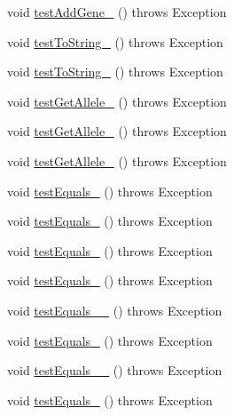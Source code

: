 \begin{DoxyCompactItemize}
\item 
void \hyperlink{classorg_1_1jgap_1_1impl_1_1_composite_gene_test_ac6b01fd11d9996a0d66044e37bbfc5b4}{test\-Add\-Gene\-\_} ()  throws Exception 
\item 
void \hyperlink{classorg_1_1jgap_1_1impl_1_1_composite_gene_test_a62e6b1961eb6dbcc835eaa65c7d4b17f}{test\-To\-String\-\_} ()  throws Exception 
\item 
void \hyperlink{classorg_1_1jgap_1_1impl_1_1_composite_gene_test_aa1d241338660b17f3e24c8630d6ea5b7}{test\-To\-String\-\_} ()  throws Exception 
\item 
void \hyperlink{classorg_1_1jgap_1_1impl_1_1_composite_gene_test_ab8d50eaecdfe73a5c69a156971c5c0e1}{test\-Get\-Allele\-\_} ()  throws Exception 
\item 
void \hyperlink{classorg_1_1jgap_1_1impl_1_1_composite_gene_test_a6bf6bbfa64aada8a4badfbf9bf7b1027}{test\-Get\-Allele\-\_} ()  throws Exception 
\item 
void \hyperlink{classorg_1_1jgap_1_1impl_1_1_composite_gene_test_ad3817f1ccfd22a82fd91740376ede5b3}{test\-Get\-Allele\-\_} ()  throws Exception 
\item 
void \hyperlink{classorg_1_1jgap_1_1impl_1_1_composite_gene_test_a83b896193c39877d30c8b31c8ef48a58}{test\-Equals\-\_} ()  throws Exception 
\item 
void \hyperlink{classorg_1_1jgap_1_1impl_1_1_composite_gene_test_acae72f0f92a01efe494631acf4c4600a}{test\-Equals\-\_} ()  throws Exception 
\item 
void \hyperlink{classorg_1_1jgap_1_1impl_1_1_composite_gene_test_a643fe407601fedafefee766499a892c5}{test\-Equals\-\_} ()  throws Exception 
\item 
void \hyperlink{classorg_1_1jgap_1_1impl_1_1_composite_gene_test_a84be6c34fe4f5b5aae3bb2e8c10aa69f}{test\-Equals\-\_} ()  throws Exception 
\item 
void \hyperlink{classorg_1_1jgap_1_1impl_1_1_composite_gene_test_a384bc605d398348fcc53f6f6cf29678a}{test\-Equals\-\_\-\_} ()  throws Exception 
\item 
void \hyperlink{classorg_1_1jgap_1_1impl_1_1_composite_gene_test_a43b715217cedcd7499cda526c82ffd53}{test\-Equals\-\_} ()  throws Exception 
\item 
void \hyperlink{classorg_1_1jgap_1_1impl_1_1_composite_gene_test_a8703f73e2f61b29ab8366d06c0677a20}{test\-Equals\-\_\-\_} ()  throws Exception 
\item 
void \hyperlink{classorg_1_1jgap_1_1impl_1_1_composite_gene_test_ae4c6aa55174f6e6264c6694eeccb6a78}{test\-Equals\-\_} ()  throws Exception 

\end{DoxyCompactItemize}
